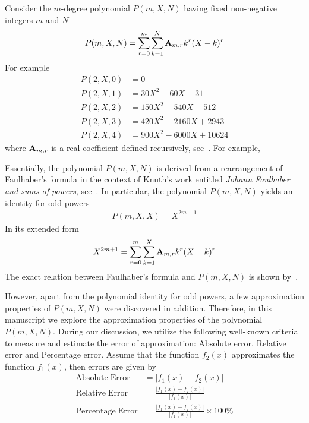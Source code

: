 Consider the $m$-degree polynomial $P(m, X, N)$ having fixed non-negative integers $m$ and $N$
\begin{align*}
    P(m,X,N) = \sum_{r=0}^{m} \sum_{k=1}^{N} {\mathbf{A}} \sb{m,r} k^r (X-k)^r
\end{align*}
For example
\begin{align*}
    P(2,X,0) &= 0 \\
    P(2,X,1) &= 30X^2 - 60X + 31 \\
    P(2,X,2) &= 150X^2 - 540X + 512 \\
    P(2,X,3) &= 420X^2 - 2160X + 2943 \\
    P(2,X,4) &= 900X^2 - 6000X + 10624
\end{align*}
where ${\mathbf{A}} \sb{m,r}$ is a real coefficient defined recursively, see~\cite{alekseyev2018mathoverflow,
    on_the_link_between_binomial_theorem_and_discrete_convolution, unusual_identity_for_odd_powers,
    history_and_overview_of_polynomial_p}.
For example,


Essentially, the polynomial $P(m, X, N)$ is derived from a rearrangement of Faulhaber's formula
in the context of Knuth's work entitled \textit{Johann Faulhaber and sums of powers}, see~\cite{knuth1993johann}.
In particular, the polynomial $P(m, X, N)$ yields an identity for odd powers
\begin{align*}
    P(m, X, X) = X^{2m+1}
\end{align*}
In its extended form
\begin{align*}
    X^{2m+1} = \sum_{r=0}^{m} \sum_{k=1}^{X} {\mathbf{A}} \sb{m,r} k^r (X-k)^r
\end{align*}
The exact relation between Faulhaber's formula and $P(m,X,N)$ is shown by~\cite{kolosov2025unexpected}.

However, apart from the polynomial identity for odd powers, a few approximation properties of $P(m,X,N)$
were discovered in addition.
Therefore, in this manuscript we explore the approximation properties of the polynomial $P(m,X,N)$.
During our discussion, we utilize the following well-known criteria to measure and estimate
the error of approximation: Absolute error, Relative error and Percentage error.
Assume that the function $f_2(x)$ approximates the function $f_1 (x)$, then errors are given by
\begin{align*}
    \mathrm{Absolute \; Error}   &= \lvert f_1(x) - f_2(x) \rvert \\
    \mathrm{Relative \; Error}   &= \frac{\lvert f_1(x) - f_2(x) \rvert}{\lvert f_1(x) \rvert} \\
    \mathrm{Percentage \; Error} &= \frac{\lvert f_1(x) - f_2(x) \rvert}{\lvert f_1(x) \rvert} \times 100\%
\end{align*}

